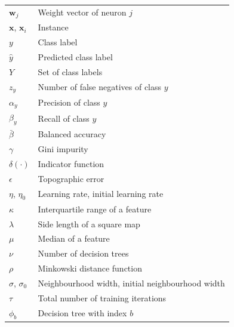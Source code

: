 \documentclass[conference]{IEEEtran}
\newcommand{\vect}[1]{\mathbf{#1}}
\begin{document}
\begin{table}[!h]
\begin{tabular}{lp{2.45in}}
$\vect{w}_j$ & Weight vector of neuron $j$ \\
$\vect{x}$, $\vect{x}_i$ & Instance \\
$y$ & Class label \\
$\hat{y}$ & Predicted class label \\
$Y$ & Set of class labels \\
$z_y$ & Number of false negatives of class $y$ \\
$\alpha_y$ & Precision of class $y$ \\
$\beta_y$ & Recall of class $y$ \\
$\bar{\beta}$ & Balanced accuracy \\
$\gamma$ & Gini impurity \\
$\delta(\cdot)$ & Indicator function \\
$\epsilon$ & Topographic error \\
$\eta$, $\eta_0$ & Learning rate, initial learning rate \\
$\kappa$ & Interquartile range of a feature \\
$\lambda$ & Side length of a square map \\
$\mu$ & Median of a feature \\
$\nu$ & Number of decision trees \\
$\rho$ & Minkowski distance function \\
$\sigma$, $\sigma_0$ & Neighbourhood width, initial neighbourhood width \\
$\tau$ & Total number of training iterations \\
$\phi_b$ & Decision tree with index $b$ \\
\bottomrule
\end{tabular}
\end{table}

\end{document}
